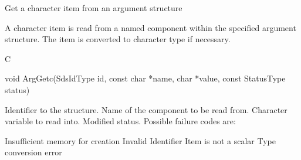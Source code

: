 \begin{manroutinedescription}
      Get a character item from an argument structure

      A character item is read from a named component within the
      specified argument structure. The item is converted to character
      type if necessary.
 
      C

      void ArgGetc(SdsIdType id, const char *name, char *value, const %
StatusType {\mantt{*}} status)
 
\begin{manparametertable}
 Identifier to the structure.
 Name of the component to be read %
from.
  Character variable to read into.
 Modified status. Possible %
failure codes are:
\end{manparametertable}
\begin{mantwocolumntable}
Insufficient memory for creation
Invalid Identifier
Item is not a scalar
Type conversion error
\end{mantwocolumntable}
\end{manroutinedescription}
